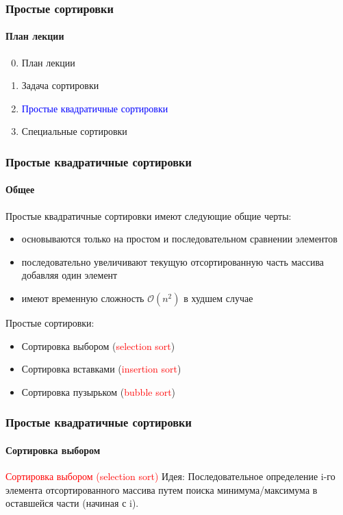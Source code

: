 \documentclass[aspectratio=169]{beamer}
\begin{document}
\begin{frame}
\frametitle{Простые сортировки}
\framesubtitle{План лекции}

\begin{enumerate}
  \setcounter{enumi}{-1}
  \item{План лекции}
  \item{Задача сортировки}
  \item{\textcolor{blue}{Простые квадратичные сортировки}}
  \item{Специальные сортировки}
\end{enumerate}
\end{frame}


\begin{frame}
\frametitle{Простые квадратичные сортировки}
\framesubtitle{Общее}
\justifying
Простые квадратичные сортировки имеют следующие общие черты:
\begin{itemize}
\item{основываются только на простом и последовательном сравнении элементов}
\item{последовательно увеличивают текущую отсортированную часть массива добавляя один элемент}
\item{имеют временную сложность $\mathcal {O}(n^2)$ в худшем случае\newline}
\end{itemize}
Простые сортировки:
\begin{itemize}
\item{Сортировка выбором (\textcolor{red}{selection sort})}
\item{Сортировка вставками (\textcolor{red}{insertion sort})}
\item{Сортировка пузырьком (\textcolor{red}{bubble sort})}
\end{itemize}
\end{frame}

\begin{frame}
\frametitle{Простые квадратичные сортировки}
\framesubtitle{Сортировка выбором}
\justifying
\textcolor{red}{Сортировка выбором (selection sort)}\newline\newline
Идея:\newline
Последовательное определение i-го элемента отсортированного массива путем поиска минимума/максимума в оставшейся части (начиная с i).

\begin{figure}
    \captionsetup[subfigure]{labelformat=empty}
    \centering
\end{figure}
\end{frame}
\end{document}
